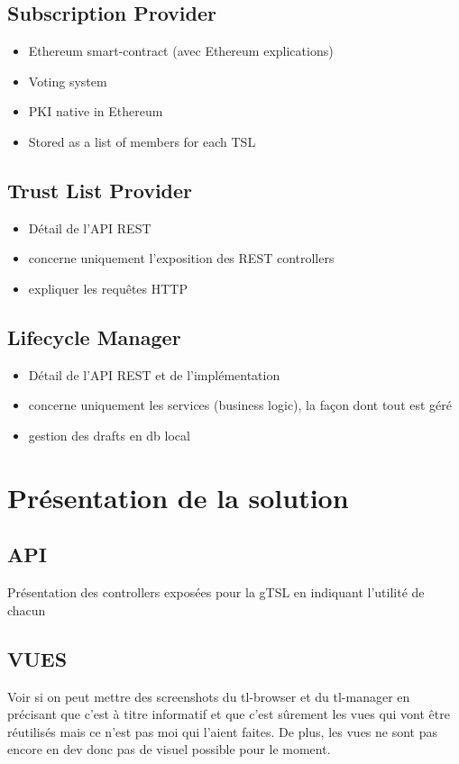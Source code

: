 \documentclass{tnreport}
\begin{document}
\subsection{Subscription Provider}

\begin{itemize}
	\item Ethereum smart-contract (avec Ethereum explications)
	\item Voting system
	\item PKI native in Ethereum
	\item Stored as a list of members for each TSL
\end{itemize}

\subsection{Trust List Provider}

\begin{itemize}
	\item Détail de l'API REST
	\item concerne uniquement l'exposition des REST controllers
	\item expliquer les requêtes HTTP
\end{itemize}

\subsection{Lifecycle Manager}

\begin{itemize}
	\item Détail de l'API REST et de l'implémentation
	\item concerne uniquement les services (business logic), la façon dont tout est géré
	\item gestion des drafts en db local
\end{itemize}

\section{Présentation de la solution}

\subsection{API}
Présentation des controllers exposées pour la gTSL en indiquant l'utilité de chacun

\subsection{VUES}
Voir si on peut mettre des screenshots du tl-browser et du tl-manager en précisant que c'est à titre informatif et que c'est sûrement les vues qui vont être réutilisés mais ce n'est pas moi qui l'aient faites. De plus, les vues ne sont pas encore en dev donc pas de visuel possible pour le moment.
\end{document}
